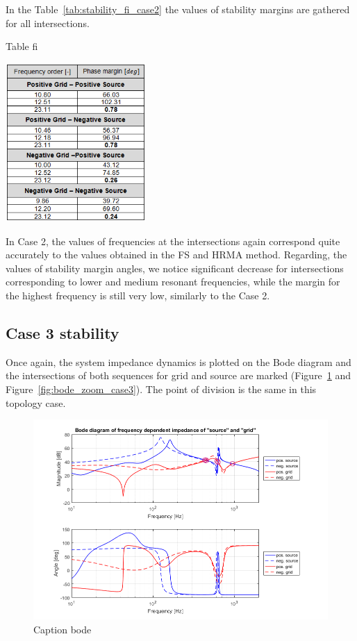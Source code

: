 \documentclass[12pt]{report} %
\begin{document}
In the Table~\ref{tab:stability_fi_case2} the values of stability margins are gathered for all intersections.

\begin{table}[htb]
	\centering
	\caption{Table fi}
	\includegraphics[width=0.4\textwidth]{img/Case2/stability_fi.png}
  	\label{tab:stability_fi_case2}
\end{table}
\FloatBarrier

In Case 2, the values of frequencies at the intersections again correspond quite accurately to the values obtained in the FS and HRMA method. Regarding, the values of stability margin angles, we notice significant decrease for intersections corresponding to lower and medium resonant frequencies, while the margin for the highest frequency is still very low, similarly to the Case 2.

\subsection{Case 3 stability}
Once again, the system impedance dynamics is plotted on the Bode diagram and the intersections of both sequences for grid and source are marked (Figure~\ref{fig:bode_case3} and Figure~\ref{fig:bode_zoom_case3}). The point of division is the same in this topology case.

\begin{figure}[htb]
	\centering
	\includegraphics[width=1\textwidth]{img/Case3/Case3_Bode.png}
	\caption{Caption bode}
  	\label{fig:bode_case3}
\end{figure}
\FloatBarrier
\end{document}
